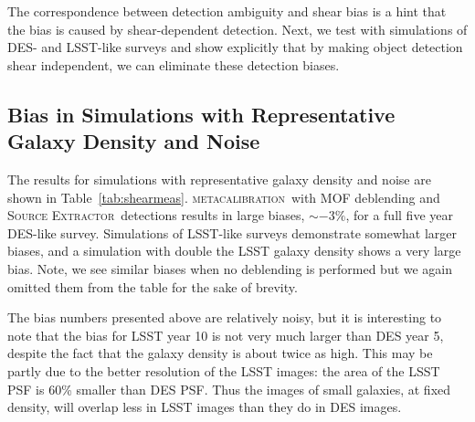 \documentclass[draft, iop, twocolappendix, appendixfloats, numberedappendix, apj]{hackemulateapj}
\newcommand{\mcal}{\textsc{metacalibration}}
\newcommand{\sx}{\textsc{Source Extractor}}
\begin{document}
The correspondence between detection ambiguity and shear bias is a hint that
the bias is caused by shear-dependent detection. Next, we test with simulations
of DES- and LSST-like surveys and show explicitly that by making object
detection shear independent, we can eliminate these detection biases.


\subsection{Bias in Simulations with Representative Galaxy Density and Noise}
\label{sec:realbias}

The results for simulations with representative galaxy density and noise are
shown in Table~\ref{tab:shearmeas}.  \mcal\ with MOF deblending and \sx\
detections results in large biases, $\sim-3\%$, for a full five year
DES-like survey. Simulations of LSST-like surveys demonstrate somewhat larger
biases, and a simulation with double the LSST galaxy density shows a very large
bias.  Note, we see similar biases when no deblending is performed but we again
omitted them from the table for the sake of brevity.

The bias numbers presented above are relatively noisy, but it is interesting to
note that the bias for LSST year 10 is not very much larger than DES year 5,
despite the fact that the galaxy density is about twice as high.  This may be
partly due to the better resolution of the LSST images: the area of the LSST
PSF is 60\% smaller than DES PSF.  Thus the images of small galaxies, at fixed
density, will overlap less in LSST images than they do in DES images.
\end{document}
